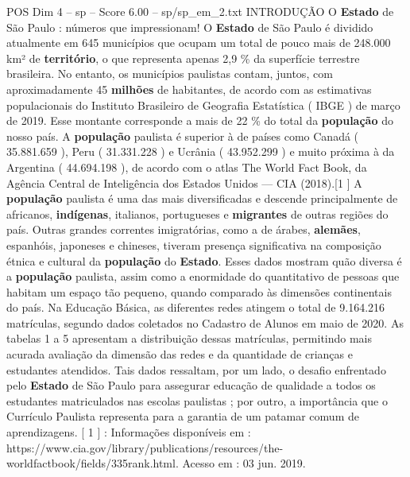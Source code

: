 \begin{textsample}{POS Dim 4 – sp – Score 6.00 – sp/sp\_em\_2.txt}  \label{ex:f4_pos_253}
INTRODUÇÃO O \textbf{Estado} de São Paulo : números que impressionam!
O \textbf{Estado} de São Paulo é dividido atualmente em 645 municípios que ocupam um total de pouco mais de 248.000 km² de \textbf{território}, o que representa apenas 2,9 \% da superfície terrestre brasileira.
No entanto, os municípios paulistas contam, juntos, com aproximadamente 45 \textbf{milhões} de habitantes, de acordo com as estimativas populacionais do Instituto Brasileiro de Geografia Estatística ( IBGE ) de março de 2019.
Esse montante corresponde a mais de 22 \% do total da \textbf{população} do nosso país.
A \textbf{população} paulista é superior à de países como Canadá ( 35.881.659 ), Peru ( 31.331.228 ) e Ucrânia ( 43.952.299 ) e muito próxima à da Argentina ( 44.694.198 ), de acordo com o atlas The World Fact Book, da Agência Central de Inteligência dos Estados Unidos — CIA (2018).[1 ] A \textbf{população} paulista é uma das mais diversificadas e descende principalmente de africanos, \textbf{indígenas}, italianos, portugueses e \textbf{migrantes} de outras regiões do país.
Outras grandes correntes imigratórias, como a de árabes, \textbf{alemães}, espanhóis, japoneses e chineses, tiveram presença significativa na composição étnica e cultural da \textbf{população} do \textbf{Estado}.
Esses dados mostram quão diversa é a \textbf{população} paulista, assim como a enormidade do quantitativo de pessoas que habitam um espaço tão pequeno, quando comparado às dimensões continentais do país.
Na Educação Básica, as diferentes redes atingem o total de 9.164.216 matrículas, segundo dados coletados no Cadastro de Alunos em maio de 2020.
As tabelas 1 a 5 apresentam a distribuição dessas matrículas, permitindo mais acurada avaliação da dimensão das redes e da quantidade de crianças e estudantes atendidos.
Tais dados ressaltam, por um lado, o desafio enfrentado pelo \textbf{Estado} de São Paulo para assegurar educação de qualidade a todos os estudantes matriculados nas escolas paulistas ; por outro, a importância que o Currículo Paulista representa para a garantia de um patamar comum de aprendizagens. [ 1 ] : Informações disponíveis em : https://www.cia.gov/library/publications/resources/the-worldfactbook/fields/335rank.html.
Acesso em : 03 jun. 2019.

\end{textsample}
